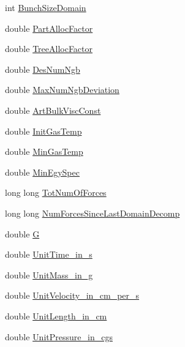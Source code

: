 \begin{DoxyCompactItemize}
\item 
int \hyperlink{structglobal__data__all__processes_abf3206e6032910640e91585c25bd85b2}{BunchSizeDomain}
\item 
double \hyperlink{structglobal__data__all__processes_aa9ceb5cacadcf2cadfc7154ab8d7fc88}{PartAllocFactor}
\item 
double \hyperlink{structglobal__data__all__processes_a374a92c40b930e388b7180b8862c3670}{TreeAllocFactor}
\item 
double \hyperlink{structglobal__data__all__processes_accb74aa1ccf3fb13e31f5704bb692313}{DesNumNgb}
\item 
double \hyperlink{structglobal__data__all__processes_a388690a6ee1497eea2f19e3984afa088}{MaxNumNgbDeviation}
\item 
double \hyperlink{structglobal__data__all__processes_a14b9df6a6579d2ce6ef7c86aa0230217}{ArtBulkViscConst}
\item 
double \hyperlink{structglobal__data__all__processes_a633fbd557554f7932dab2641d15e6ea1}{InitGasTemp}
\item 
double \hyperlink{structglobal__data__all__processes_a728a84084280f547b1b68dbb143570ad}{MinGasTemp}
\item 
double \hyperlink{structglobal__data__all__processes_ae298f2b76a8f1d0b932bee24c28987cf}{MinEgySpec}
\item 
long long \hyperlink{structglobal__data__all__processes_a44181b6f6375de86c7dda1059d2fc3f4}{TotNumOfForces}
\item 
long long \hyperlink{structglobal__data__all__processes_a64e0b5f35f25dd09297bc41acf0502f7}{NumForcesSinceLastDomainDecomp}
\item 
double \hyperlink{structglobal__data__all__processes_a1250b5c6e116b576ff09cbcd928d2063}{G}
\item 
double \hyperlink{structglobal__data__all__processes_a4fa94d45bad042101623c3403f6b8c37}{UnitTime\_\-in\_\-s}
\item 
double \hyperlink{structglobal__data__all__processes_adccf5aa82d4252d8d24ead7681b29052}{UnitMass\_\-in\_\-g}
\item 
double \hyperlink{structglobal__data__all__processes_a04f4a1972c99f3ab4ba2483237a9d8ab}{UnitVelocity\_\-in\_\-cm\_\-per\_\-s}
\item 
double \hyperlink{structglobal__data__all__processes_a111a45896aafd67faa8f0c9ef897612f}{UnitLength\_\-in\_\-cm}
\item 
double \hyperlink{structglobal__data__all__processes_a4938f30bc3da1d4583d42f806ad11201}{UnitPressure\_\-in\_\-cgs}

\end{DoxyCompactItemize}
